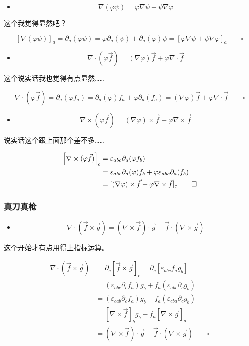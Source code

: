 \documentclass{article}
\begin{document}
\begin{itemize}
    \item $$\nabla(\varphi\psi)=\varphi\nabla\psi+\psi\nabla\varphi$$
\end{itemize}

这个我觉得显然吧？

$$[\nabla(\varphi\psi)]_{a}=\partial_{a}(\varphi\psi)=\varphi\partial_{a}(\psi)+\partial_{a}(\varphi)\psi=[\varphi\nabla\psi+\psi\nabla\varphi]_{a}\qquad\square$$

\begin{itemize}
    \item $$\nabla\cdot(\varphi\vec{f})=(\nabla\varphi)\vec{f}+\varphi\nabla\cdot\vec{f}$$
\end{itemize}

这个说实话我也觉得有点显然……

$$\nabla\cdot(\varphi\vec{f})=\partial_{a}(\varphi f_{a})=\partial_{a}(\varphi)f_{a}+\varphi\partial_{a}(f_{a})=(\nabla\varphi)\vec{f}+\varphi\nabla\cdot\vec{f}\qquad\square$$

\begin{itemize}
    \item $$\nabla\times(\varphi\vec{f})=(\nabla\varphi)\times\vec{f}+\varphi\nabla\times\vec{f}$$
\end{itemize}

说实话这个跟上面那个差不多……

$$\begin{aligned}
      \qty[\nabla\times(\varphi\vec{f})]_{c} & =\varepsilon_{abc}\partial_{a}(\varphi f_{b})\\
      & =\varepsilon_{abc}\partial_{a}(\varphi)f_{b}+\varphi\varepsilon_{abc}\partial_{a}(f_{b})\\
      & =[(\nabla\varphi)\times\vec{f}+\varphi\nabla\times\vec{f}]_{c}\qquad\square
   \end{aligned}$$

\subsubsection{真刀真枪}

\begin{itemize}
    \item $$\nabla\cdot(\vec{f}\times\vec{g})=(\nabla\times\vec{f})\cdot\vec{g}-\vec{f}\cdot(\nabla\times\vec{g})$$
\end{itemize}

这个开始才有点用得上指标运算。

$$\begin{aligned}
    \nabla\cdot(\vec{f}\times\vec{g})&=\partial_{c}[\vec{f}\times\vec{g}]_{c}=\partial_{c}[\varepsilon_{abc}f_{a}g_{b}]\\
    &=(\varepsilon_{abc}\partial_{c}f_{a})g_{b}+f_{a}(\varepsilon_{abc}\partial_{c}g_{b})\\
    &=(\varepsilon_{cab}\partial_{c}f_{a})g_{b}-f_{a}(\varepsilon_{cba}\partial_{c}g_{b})\\
    &=[\nabla\times\vec{f}]_{b}g_{b}-f_{a}[\nabla\times\vec{g}]_{a}\\
    &=(\nabla\times\vec{f})\cdot\vec{g}-\vec{f}\cdot(\nabla\times\vec{g})\qquad\square
\end{aligned}$$
\end{document}

